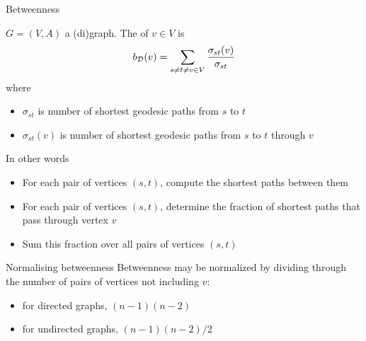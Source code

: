 \documentclass[aspectratio=169]{beamer}\usepackage[]{graphicx}\usepackage[]{xcolor}
\begin{document}
\begin{frame}{Betweenness}
\begin{definition}[Betweenness]
	$G=(V,A)$ a (di)graph. The  of $v\in V$ is
	\[
	b_{\mathcal{D}}(v)= \sum_{s\neq t\neq v  \in V} \frac{\sigma_{st}(v)}{\sigma_{st}}
	\]
	where
	\begin{itemize}
	\item $\sigma_{st}$ is number of shortest geodesic paths from $s$ to $t$
	\item $\sigma_{st}(v)$ is number of shortest geodesic paths from $s$ to $t$ through $v$
	\end{itemize}		
\end{definition}
\end{frame}

\begin{frame}
In other words
\begin{itemize}
	\item For each pair of vertices $(s,t)$, compute the shortest paths between them
	\item For each pair of vertices $(s,t)$, determine the fraction of shortest paths that pass through vertex $v$
	\item Sum this fraction over all pairs of vertices $(s,t)$
\end{itemize}
\end{frame}

\begin{frame}{Normalising betweenness}
	Betweenness may be normalized by dividing through the number of pairs of vertices not including $v$:
	\begin{itemize}
		\item for directed graphs, $(n-1)(n-2)$
		\item for undirected graphs, $(n-1)(n-2)/2$
	\end{itemize}
\end{frame}
\end{document}
